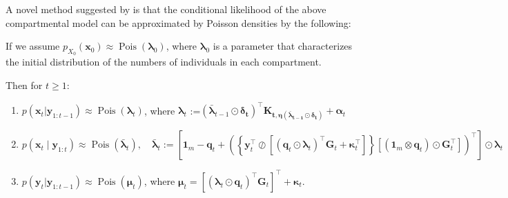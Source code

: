 \documentclass[10pt]{article}
\begin{document}
A novel method suggested by \cite{wwr} is that the conditional likelihood of the above compartmental model can be approximated by Poisson densities by the following:


If we assume $p_{X_0}(\bm{x}_0) \approx \operatorname{Pois}(\bm{\lambda}_0)$, where $\bm{\lambda}_0$ is a parameter that characterizes the initial distribution of the numbers of individuals in each compartment. 

Then for $t \geq 1$:

\begin{enumerate}
    \item $p(\bm{x}_t|\bm{y}_{1:t-1}) \approx \operatorname{Pois}(\bm{\lambda}_t)$, where $\bm{\lambda}_t$ :=$(\bm{\bar{\lambda}}_{t-1} \odot \bm{\delta_t})^\intercal \bm{K_{t,\eta(\bm{\bar{\lambda}}_{t-1} \odot \bm{\delta_t})}} + \bm{\alpha}_t$     
    \item 

    $p\left(\mathbf{x}_t \mid \mathbf{y}_{1: t}\right) \approx \operatorname{Pois}\left(\bm{\bar{\lambda}}_t\right), \quad \bm{\bar{\lambda}}_t:=\left[\mathbf{1}_m-\mathbf{q}_t+\left(\left\{\mathbf{y}_t^{\top} \oslash\left[\left(\mathbf{q}_t \odot \bm{\lambda}_t\right)^{\top} \mathbf{G}_t+\boldsymbol{\kappa}_t^{\top}\right]\right\}\left[\left(\mathbf{1}_m \otimes \mathbf{q}_t\right) \odot \mathbf{G}_t^{\top}\right]\right)^{\top}\right] \odot \bm{\lambda}_t$

    \item $p(\mathbf{y}_t|\bm{y}_{1:t-1}) \approx \operatorname{Pois}\left(\bm{\mu}_t\right)$, where $\bm{\mu}_t = \left[(\bm{\lambda}_t \odot \mathbf{q}_t)^{\top} \mathbf{G}_t\right]^{\top}+\boldsymbol{\kappa}_t$.
\end{enumerate}
\end{document}
